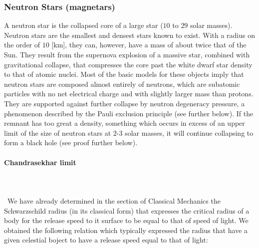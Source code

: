 	\subsubsection{Neutron Stars (magnetars)}
	A neutron star is the collapsed core of a large star ($10$ to $29$ solar masses). Neutron stars are the smallest and densest stars known to exist. With a radius on the order of $10$ [km], they can, however, have a mass of about twice that of the Sun. They result from the supernova explosion of a massive star, combined with gravitational collapse, that compresses the core past the white dwarf star density to that of atomic nuclei. Most of the basic models for these objects imply that neutron stars are composed almost entirely of neutrons, which are subatomic particles with no net electrical charge and with slightly larger mass than protons. They are supported against further collapse by neutron degeneracy pressure, a phenomenon described by the Pauli exclusion principle (see further below). If the remnant has too great a density, something which occurs in excess of an upper limit of the size of neutron stars at $2$-$3$ solar masses, it will continue collapsing to form a black hole (see proof further below).
	
	\paragraph{Chandrasekhar limit}\mbox{}\\\\\
	We have already determined in the section of Classical Mechanics the Schwarzschild radius (in its classical form) that expresses the critical radius of a body for the release speed to it surface to be equal to that of speed of light. We obtained the following relation which typically expressed the radius that have a given celestial boject to have a release speed equal to that of light:
	
